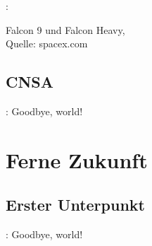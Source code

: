 \documentclass[notes]{beamer}
\begin{document}
\begin{frame}{\insertsection: \insertsubsection}
\begin{minipage}{.5\textwidth}
{		{\tiny Falcon 9 und Falcon Heavy,
			\\ Quelle: spacex.com}}
	
		
	\end{minipage}
\end{frame}

\subsection{CNSA}
\begin{frame}{\insertsection: \insertsubsection}
	Goodbye, world!
\end{frame}

\section{Ferne Zukunft}
\subsection{Erster Unterpunkt}
\begin{frame}{\insertsection: \insertsubsection}
	Goodbye, world!
\end{frame}
\end{document}
